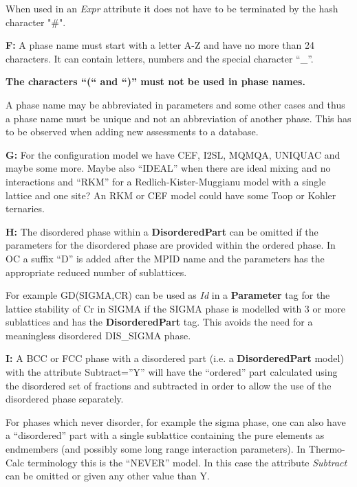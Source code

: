 \documentclass{article}
\begin{document}
\begin{description}
  When used in an {\em Expr} attribute it does not have to be
  terminated by the hash character "\#".

  \newpage
  
\item{\bf F:} A phase name must start with a letter A-Z and have no
  more than 24 characters.  It can contain letters, numbers and the
  special character ``\_''.

  {\bf The characters ``(`` and ``)'' must not be used in phase
    names.}

  A phase name may be abbreviated in parameters and some other cases
  and thus a phase name must be unique and not an abbreviation of
  another phase.  This has to be observed when adding new assessments
  to a database.

\item{\bf G:} For the configuration model we have CEF, I2SL, MQMQA,
  UNIQUAC and maybe some more.  Maybe also ``IDEAL'' when there are
  ideal mixing and no interactions and ``RKM'' for a
  Redlich-Kister-Muggianu model with a single lattice and one site?
  An RKM or CEF model could have some Toop or Kohler ternaries.

\item{\bf H:} The disordered phase within a {\bf DisorderedPart} can
  be omitted if the parameters for the disordered phase are provided
  within the ordered phase.  In OC a suffix ``D'' is added after the
  MPID name and the parameters has the appropriate reduced number of
  sublattices.
  
  For example GD(SIGMA,CR) can be used as {\em Id} in a {\bf
    Parameter} tag for the lattice stability of Cr in SIGMA if the
  SIGMA phase is modelled with 3 or more sublattices and has the {\bf
    DisorderedPart} tag.  This avoids the need for a meaningless
  disordered DIS\_SIGMA phase.

\item{\bf I:}  A BCC or FCC phase with a disordered part (i.e.  a {\bf
    DisorderedPart} model) with the attribute Subtract=''Y'' will have
  the ``ordered'' part calculated using the disordered set of
  fractions and subtracted in order to allow the use of the disordered
  phase separately.

  For phases which never disorder, for example the sigma phase, one
  can also have a ``disordered'' part with a single sublattice
  containing the pure elements as endmembers (and possibly some long
  range interaction parameters).  In Thermo-Calc terminology this is
  the ``NEVER'' model.  In this case the attribute {\em Subtract} can
  be omitted or given any other value than Y.


\end{description}
\end{document}
